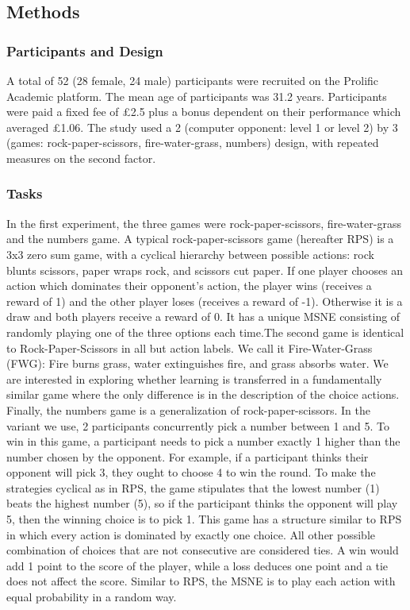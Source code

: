\documentclass[man,floatsintext]{apa6}
\begin{document}
\hypertarget{methods}{%
\subsection{Methods}\label{methods}}

\hypertarget{participants-and-design}{%
\subsubsection{Participants and Design}\label{participants-and-design}}

A total of 52 (28 female, 24 male) participants were recruited on the Prolific Academic platform. The mean age of participants was 31.2 years. Participants were paid a fixed fee of £2.5 plus a bonus dependent on their performance which averaged £1.06. The study used a 2 (computer opponent: level 1 or level 2) by 3 (games: rock-paper-scissors, fire-water-grass, numbers) design, with repeated measures on the second factor.

\hypertarget{tasks}{%
\subsubsection{Tasks}\label{tasks}}

In the first experiment, the three games were rock-paper-scissors, fire-water-grass and the numbers game. A typical rock-paper-scissors game (hereafter RPS) is a 3x3 zero sum game, with a cyclical hierarchy between possible actions: rock blunts scissors, paper wraps rock, and scissors cut paper. If one player chooses an action which dominates their opponent's action, the player wins (receives a reward of 1) and the other player loses (receives a reward of -1). Otherwise it is a draw and both players receive a reward of 0. It has a unique MSNE consisting of randomly playing one of the three options each time.The second game is identical to Rock-Paper-Scissors in all but action labels. We call it Fire-Water-Grass (FWG): Fire burns grass, water extinguishes fire, and grass absorbs water. We are interested in exploring whether learning is transferred in a fundamentally similar game where the only difference is in the description of the choice actions. Finally, the numbers game is a generalization of rock-paper-scissors. In the variant we use, 2 participants concurrently pick a number between 1 and 5. To win in this game, a participant needs to pick a number exactly 1 higher than the number chosen by the opponent. For example, if a participant thinks their opponent will pick 3, they ought to choose 4 to win the round. To make the strategies cyclical as in RPS, the game stipulates that the lowest number (1) beats the highest number (5), so if the participant thinks the opponent will play 5, then the winning choice is to pick 1. This game has a structure similar to RPS in which every action is dominated by exactly one choice. All other possible combination of choices that are not consecutive are considered ties. A win would add 1 point to the score of the player, while a loss deduces one point and a tie does not affect the score. Similar to RPS, the MSNE is to play each action with equal probability in a random way.
\end{document}

